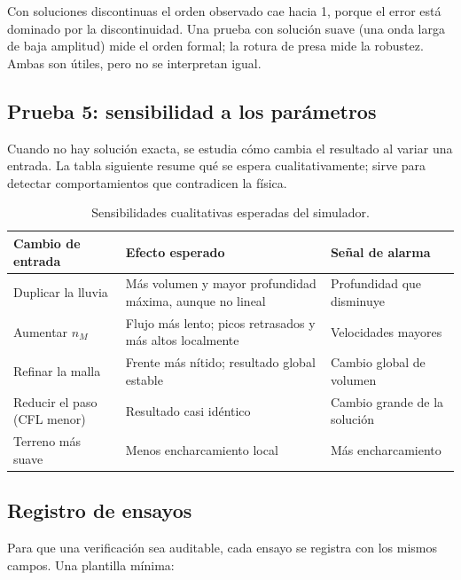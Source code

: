 \documentclass[11pt,a4paper]{article}
\begin{document}
\begin{cuidado}
Con soluciones discontinuas el orden observado cae hacia 1, porque el error está dominado por la
discontinuidad. Una prueba con solución suave (una onda larga de baja amplitud) mide el orden formal; la
rotura de presa mide la robustez. Ambas son útiles, pero no se interpretan igual.
\end{cuidado}

\subsection{Prueba 5: sensibilidad a los parámetros}

Cuando no hay solución exacta, se estudia cómo cambia el resultado al variar una entrada. La tabla
siguiente resume qué se espera cualitativamente; sirve para detectar comportamientos que contradicen la física.

\begin{table}[htbp]
\centering
\caption{Sensibilidades cualitativas esperadas del simulador.}
\label{tab:sensibilidad}
\small
\begin{tabularx}{\linewidth}{@{}lXX@{}}
\toprule
Cambio de entrada & Efecto esperado & Señal de alarma \\
\midrule
Duplicar la lluvia & Más volumen y mayor profundidad máxima, aunque no lineal & Profundidad que disminuye \\
Aumentar $n_M$ & Flujo más lento; picos retrasados y más altos localmente & Velocidades mayores \\
Refinar la malla & Frente más nítido; resultado global estable & Cambio global de volumen \\
Reducir el paso (CFL menor) & Resultado casi idéntico & Cambio grande de la solución \\
Terreno más suave & Menos encharcamiento local & Más encharcamiento \\
\bottomrule
\end{tabularx}
\end{table}

\subsection{Registro de ensayos}

Para que una verificación sea auditable, cada ensayo se registra con los mismos campos. Una plantilla mínima:
\end{document}
